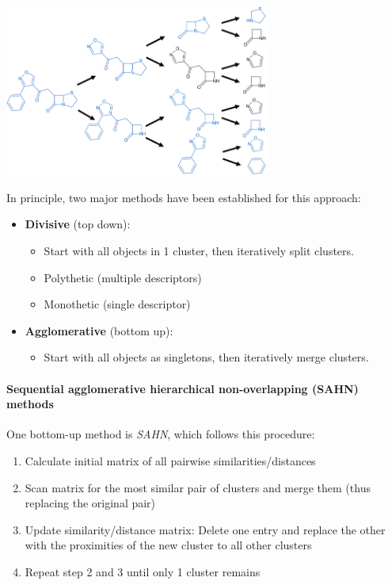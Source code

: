 \begin{center}\includegraphics[width=0.65\textwidth]{img/cheminformatics/ClusteringHierarchicalTree.png}\end{center}

In principle, two major methods have been established for this approach:

\begin{itemize}
    \item \textbf{Divisive} (top down):
    \begin{itemize}
        \item Start with all objects in 1 cluster, then iteratively split clusters.
        \item Polythetic (multiple descriptors)
        \item Monothetic (single descriptor)
    \end{itemize}
    \item \textbf{Agglomerative} (bottom up):
    \begin{itemize}
        \item Start with all objects as singletons, then iteratively merge clusters.
    \end{itemize}
\end{itemize}

\paragraph{Sequential agglomerative hierarchical non-overlapping (SAHN) methods}
One bottom-up method is \emph{SAHN}, which follows this procedure:

\begin{enumerate}
    \item Calculate initial matrix of all pairwise similarities/distances
    \item Scan matrix for the most similar pair of clusters and merge them (thus replacing the original pair)
    \item Update similarity/distance matrix: Delete one entry and replace the other with the proximities of the new cluster to all other clusters
    \item Repeat step 2 and 3 until only 1 cluster remains
\end{enumerate}


